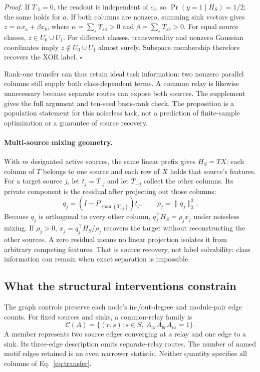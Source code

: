 \emph{Proof.} If $T_{:b}=0$, the readout is independent of $c_b$,
so $\Pr(y=1\mid H_S)=1/2$; the same holds for $a$.
If both columns are nonzero, summing sink vectors gives
$z=\alpha x_a+\beta x_b$, where
$\alpha=\sum_sT_{sa}>0$ and $\beta=\sum_sT_{sb}>0$.
For equal source classes, $z\in U_0\cup U_1$. For different classes,
transversality and nonzero Gaussian coordinates imply
$z\notin U_0\cup U_1$ almost surely. Subspace membership therefore
recovers the XOR label. $\square$

Rank-one transfer can thus retain ideal task information: two nonzero
parallel columns still supply both class-dependent terms. A common relay
is likewise unnecessary because separate routes can expose both sources.
The supplement gives the full argument and ten-seed basis-rank check.
The proposition is a population statement for this noiseless task, not a
prediction of finite-sample optimization or a guarantee of source recovery.

\paragraph{Multi-source mixing geometry.}
With $m$ designated active sources, the same linear prefix gives
$H_S=TX$: each column of $T$ belongs to one source and each row of $X$
holds that source's features. For a target source $j$, let $t_j=T_{:j}$
and let $T_{-j}$ collect the other columns. Its private component is the
residual after projecting out those columns:
\begin{equation}
 q_j=(I-P_{\operatorname{span}(T_{-j})})t_j,\qquad
 \rho_j=\|q_j\|_2^2.
 \label{eq:private}
\end{equation}
Because $q_j$ is orthogonal to every other column,
$q_j^\top H_S=\rho_j x_j$ under noiseless mixing. If $\rho_j>0$,
$x_j=q_j^\top H_S/\rho_j$ recovers the target without reconstructing the
other sources. A zero residual means no linear projection isolates it from
arbitrary competing features. That is source recovery, not label solvability:
class information can remain when exact separation is impossible.

\subsection{What the structural interventions constrain}
\label{sec:paths}

The graph controls preserve each node's in-/out-degree and module-pair
edge counts. For fixed sources and sinks, a common-relay family is
\begin{equation}
 \mathcal C(A)=\{(r,s):s\in S,\ A_{ar}A_{br}A_{rs}=1\}.
 \label{eq:paths}
\end{equation}
A member represents two source edges converging at a relay and one edge
to a sink. Its three-edge description omits separate-relay routes.
The number of named motif edges retained is an even narrower statistic.
Neither quantity specifies all columns of Eq.~\eqref{eq:transfer}.

